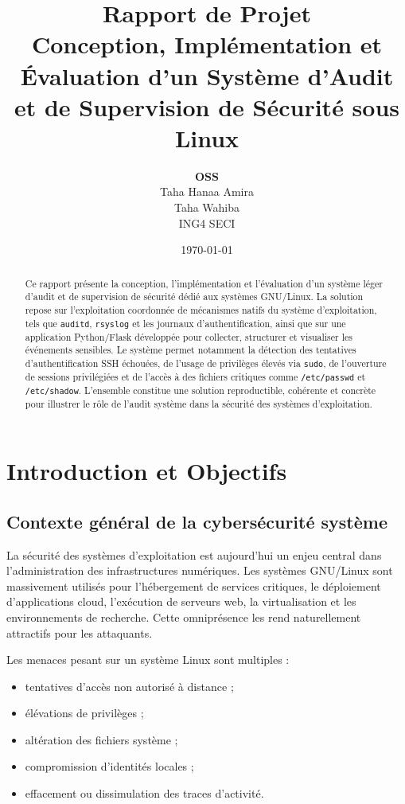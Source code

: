 \documentclass[12pt,a4paper]{article}
\title{\Huge\textbf{Rapport de Projet}\\[0.5cm]
\Large\textbf{Conception, Implémentation et Évaluation d'un Système d’Audit et de Supervision de Sécurité sous Linux}}
\author{\textbf{OSS}\\Taha Hanaa Amira \\ Taha Wahiba \\ ING4 SECI }
\date{\today}
\begin{document}
\begin{titlepage}
    \maketitle
    \vfill
    \begin{abstract}
    Ce rapport présente la conception, l’implémentation et l’évaluation d’un système léger d’audit et de supervision de sécurité dédié aux systèmes GNU/Linux. La solution repose sur l’exploitation coordonnée de mécanismes natifs du système d’exploitation, tels que \texttt{auditd}, \texttt{rsyslog} et les journaux d’authentification, ainsi que sur une application Python/Flask développée pour collecter, structurer et visualiser les événements sensibles. Le système permet notamment la détection des tentatives d’authentification SSH échouées, de l’usage de privilèges élevés via \texttt{sudo}, de l’ouverture de sessions privilégiées et de l’accès à des fichiers critiques comme \texttt{/etc/passwd} et \texttt{/etc/shadow}. L’ensemble constitue une solution reproductible, cohérente et concrète pour illustrer le rôle de l’audit système dans la sécurité des systèmes d’exploitation.
    \end{abstract}
    \vfill
\end{titlepage}

\newpage
\tableofcontents
\newpage

\section{Introduction et Objectifs}

\subsection{Contexte général de la cybersécurité système}

La sécurité des systèmes d’exploitation est aujourd’hui un enjeu central dans l’administration des infrastructures numériques. Les systèmes GNU/Linux sont massivement utilisés pour l’hébergement de services critiques, le déploiement d’applications cloud, l’exécution de serveurs web, la virtualisation et les environnements de recherche. Cette omniprésence les rend naturellement attractifs pour les attaquants.

Les menaces pesant sur un système Linux sont multiples :
\begin{itemize}
    \item tentatives d’accès non autorisé à distance ;
    \item élévations de privilèges ;
    \item altération des fichiers système ;
    \item compromission d’identités locales ;
    \item effacement ou dissimulation des traces d’activité.
\end{itemize}
\end{document}
